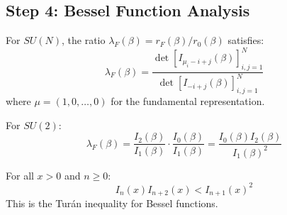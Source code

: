 \subsection{Step 4: Bessel Function Analysis}

\begin{theorem}
\label{thm:bessel-rep}
For $SU(N)$, the ratio $\lambda_F(\beta) = r_F(\beta)/r_0(\beta)$ satisfies:
\begin{equation}
\lambda_F(\beta) = \frac{\det[I_{\mu_i - i + j}(\beta)]_{i,j=1}^N}{\det[I_{-i+j}(\beta)]_{i,j=1}^N}
\end{equation}
where $\mu = (1, 0, \ldots, 0)$ for the fundamental representation.

For $SU(2)$:
\begin{equation}
\lambda_F(\beta) = \frac{I_2(\beta)}{I_1(\beta)} \cdot \frac{I_0(\beta)}{I_1(\beta)} = \frac{I_0(\beta) I_2(\beta)}{I_1(\beta)^2}
\end{equation}
\end{theorem}

\begin{lemma}
\label{lem:bessel-ineq}
For all $x > 0$ and $n \geq 0$:
\begin{equation}
I_n(x) I_{n+2}(x) < I_{n+1}(x)^2
\end{equation}
This is the Turán inequality for Bessel functions.
\end{lemma}

